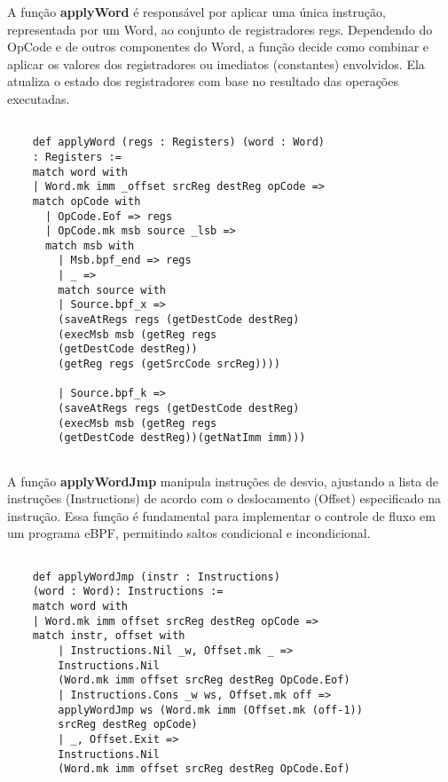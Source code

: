 \documentclass[sigconf]{acmart}
\begin{document}
A função \textbf{applyWord} é responsável por aplicar uma única instrução, representada por um Word, ao conjunto de registradores regs. Dependendo do OpCode e de outros componentes do Word, a função decide como combinar e aplicar os valores dos registradores ou imediatos (constantes) envolvidos. Ela atualiza o estado dos registradores com base no resultado das operações executadas.

\begin{center}
\begin{verbatim}
    
    def applyWord (regs : Registers) (word : Word) 
    : Registers :=
    match word with 
    | Word.mk imm _offset srcReg destReg opCode =>
    match opCode with
      | OpCode.Eof => regs 
      | OpCode.mk msb source _lsb => 
      match msb with 
        | Msb.bpf_end => regs  
        | _ =>  
        match source with    
        | Source.bpf_x => 
        (saveAtRegs regs (getDestCode destReg)
        (execMsb msb (getReg regs 
        (getDestCode destReg))
        (getReg regs (getSrcCode srcReg))))    
        
        | Source.bpf_k =>
        (saveAtRegs regs (getDestCode destReg)
        (execMsb msb (getReg regs 
        (getDestCode destReg))(getNatImm imm)))
            
\end{verbatim}
\end{center}

A função \textbf{applyWordJmp} manipula instruções de desvio, ajustando a lista de instruções (Instructions) de acordo com o deslocamento (Offset) especificado na instrução. Essa função é fundamental para implementar o controle de fluxo em um programa eBPF, permitindo saltos condicional e incondicional.
\begin{center}
\begin{verbatim}
    
    def applyWordJmp (instr : Instructions) 
    (word : Word): Instructions :=
    match word with
    | Word.mk imm offset srcReg destReg opCode =>
    match instr, offset with
        | Instructions.Nil _w, Offset.mk _ =>
        Instructions.Nil 
        (Word.mk imm offset srcReg destReg OpCode.Eof)
        | Instructions.Cons _w ws, Offset.mk off =>
        applyWordJmp ws (Word.mk imm (Offset.mk (off-1))
        srcReg destReg opCode)
        | _, Offset.Exit =>
        Instructions.Nil 
        (Word.mk imm offset srcReg destReg OpCode.Eof)

\end{verbatim}
\end{center}
\end{document}
